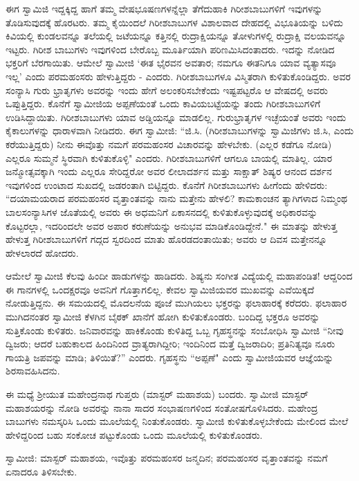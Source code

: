 ಈಗ ಸ್ವಾಮಿಜಿ ಇದ್ದಕ್ಕಿದ್ದ ಹಾಗೆ ತಮ್ಮ ವೇಷಭೂಷಣಗಳನ್ನೆಲ್ಲಾ ತೆಗೆದುಹಾಕಿ ಗಿರೀಶಬಾಬುಗಳಿಗೆ ಇವುಗಳನ್ನು ತೊಡಿಸುವುದಕ್ಕೆ ಹೊರಟರು. ತಮ್ಮ ಕೈಯಿಂದಲೆ ಗಿರೀಶಬಾಬುಗಳ ವಿಶಾಲವಾದ ದೇಹದಲ್ಲಿ ವಿಭೂತಿಯನ್ನು ಬಳಿದು ಕಿವಿಯಲ್ಲಿ ಕುಂಡಲವನ್ನೂ ತಲೆಯಲ್ಲಿ ಜಟೆಯನ್ನೂ ಕತ್ತಿನಲ್ಲಿ ರುದ್ರಾಕ್ಷಿಯನ್ನೂ ತೋಳುಗಳಲ್ಲಿ ರುದ್ರಾಕ್ಷಿ ವಲಯವನ್ನೂ ಇಟ್ಟರು. ಗಿರೀಶ ಬಾಬುಗಳು ಇವುಗಳಿಂದ ಬೇರೊಬ್ಬ ಮೂರ್ತಿಯಾಗಿ ಪರಿಣಮಿಸಿದಂತಾದರು. ಇದನ್ನು ನೋಡಿದ ಭಕ್ತರಿಗೆ ಬೆರಗಾಯಿತು. ಆಮೇಲೆ ಸ್ವಾಮೀಜಿ ‘ಈತ ಭೈರವನ ಅವತಾರ; ನಮಗೂ ಈತನಿಗೂ ಯಾವ ವ್ಯತ್ಯಾಸವೂ ಇಲ್ಲ’ ಎಂದು ಪರಮಹಂಸರು ಹೇಳುತ್ತಿದ್ದರು - ಎಂದರು. ಗಿರೀಶಬಾಬುಗಳೂ ವಿಸ್ಮಿತರಾಗಿ ಕುಳಿತುಕೊಂಡಿದ್ದರು. ಅವರ ಸಂನ್ಯಾಸಿ ಗುರು ಭ್ರಾತೃಗಳು ಅವರನ್ನು ಇಂದು ಹೇಗೆ ಅಲಂಕರಿಸಬೇಕೆಂದು ಇಷ್ಟಪಟ್ಟರೊ ಆ ವೇಷದಲ್ಲಿ ಅವರು ಒಪ್ಪುತ್ತಿದ್ದರು. ಕೊನೆಗೆ ಸ್ವಾಮೀಜಿಯ ಅಪ್ಪಣೆಯಂತೆ ಒಂದು ಕಾವಿಯಬಟ್ಟೆಯನ್ನು ತಂದು ಗಿರೀಶಬಾಬುಗಳಿಗೆ ಉಡಿಸಿದ್ದಾಯಿತು. ಗಿರೀಶಬಾಬುಗಳು ಯಾವ ಅಡ್ಡಿಯನ್ನೂ ಮಾಡಲಿಲ್ಲ. ಗುರುಭ್ರಾತೃಗಳ ಇಚ್ಛೆಯಂತೆ ಅವರು ಇಂದು ಕೈಕಾಲುಗಳನ್ನು ಧಾರಾಳವಾಗಿ ನೀಡಿದರು. ಈಗ ಸ್ವಾಮೀಜಿ: “ಜಿ.ಸಿ. (ಗಿರೀಶಬಾಬುಗಳನ್ನು ಸ್ವಾಮಿಜಿಗಳು ಜಿ.ಸಿ, ಎಂದು ಕರೆಯುತ್ತಿದ್ದರು) ನೀನು ಈವೊತ್ತು ನಮಗೆ ಪರಮಹಂಸರ ವಿಚಾರವನ್ನು ಹೇಳಬೇಕು. (ಎಲ್ಲರ ಕಡೆಗೂ ನೋಡಿ) ಎಲ್ಲರೂ ಸುಮ್ಮನೆ ಸ್ಥಿರವಾಗಿ ಕುಳಿತುಕೊಳ್ಳಿ" ಎಂದರು. ಗಿರೀಶಬಾಬುಗಳಿಗೆ ಆಗಲೂ ಬಾಯಲ್ಲಿ ಮಾತಿಲ್ಲ. ಯಾರ ಜನ್ಮೋತ್ಸವಕ್ಕಾಗಿ ಇಂದು ಎಲ್ಲರೂ ಸೇರಿದ್ದರೋ ಅವರ ಲೀಲಾದರ್ಶನ ಮತ್ತು ಸಾಕ್ಷಾತ್ ಶಿಷ್ಯರ ಆನಂದ ದರ್ಶನ ಇವುಗಳಿಂದ ಉಂಟಾದ ಸುಖದಲ್ಲಿ ಜಡರಂತಾಗಿ ಬಿಟ್ಟಿದ್ದರು. ಕೊನೆಗೆ ಗಿರೀಶಬಾಬುಗಳು ಹೀಗೆಂದು ಹೇಳಿದರು: “ದಯಾಮಯರಾದ ಪರಮಹಂಸರ ವೃತ್ತಾಂತವನ್ನು ನಾನು ಮತ್ತೇನು ಹೇಳಲಿ? ಕಾಮಕಾಂಚನ ತ್ಯಾಗಿಗಳಾದ ನಿಮ್ಮಂಥ ಬಾಲಸಂನ್ಯಾಸಿಗಳ ಜೊತೆಯಲ್ಲಿ ಅವರು ಈ ಅಧಮನಿಗೆ ಏಕಾಸನದಲ್ಲಿ ಕುಳಿತುಕೊಳ್ಳುವುದಕ್ಕೆ ಅಧಿಕಾರವನ್ನು ಕೊಟ್ಟರಲ್ಲಾ, ಇದರಿಂದಲೇ ಅವರ ಅಪಾರ ಕರುಣೆಯನ್ನು ಅನುಭವ ಮಾಡಿಕೊಂಡಿದ್ದೇನೆ." ಈ ಮಾತನ್ನು ಹೇಳುತ್ತ ಹೇಳುತ್ತ ಗಿರೀಶಬಾಬುಗಳಿಗೆ ಗದ್ಗದ ಸ್ವರದಿಂದ ಮಾತು ಹೊರಡದಂತಾಯಿತು; ಅವರು ಆ ದಿವಸ ಮತ್ತೇನನ್ನೂ ಹೇಳಲಾರದೆ ಹೋದರು.

ಆಮೇಲೆ ಸ್ವಾಮೀಜಿ ಕೆಲವು ಹಿಂದೀ ಹಾಡುಗಳನ್ನು ಹಾಡಿದರು. ಶಿಷ್ಯನು ಸಂಗೀತ ವಿದ್ಯೆಯಲ್ಲಿ ಮಹಾಪಂಡಿತ! ಆದ್ದರಿಂದ ಈ ಗಾನಗಳಲ್ಲಿ ಒಂದಕ್ಷರವೂ ಅವನಿಗೆ ಗೊತ್ತಾಗಲಿಲ್ಲ. ಕೇವಲ ಸ್ವಾಮಿಜಿಯವರ ಮುಖವನ್ನು ಎವೆಯಿಕ್ಕದೆ ನೋಡುತ್ತಿದ್ದನು. ಈ ಸಮಯದಲ್ಲಿ ಮೊದಲನೆಯ ಪೂಜೆ ಮುಗಿಯಲು ಭಕ್ತರನ್ನು ಫಲಾಹಾರಕ್ಕೆ ಕರೆದರು. ಫಲಾಹಾರ ಮುಗಿದನಂತರ ಸ್ವಾಮೀಜಿ ಕೆಳಗಿನ ಬೈಠಕ್ ಖಾನೆಗೆ ಹೋಗಿ ಕುಳಿತುಕೊಂಡರು. ಬಂದಿದ್ದ ಭಕ್ತರೂ ಅವರನ್ನು ಸುತ್ತಿಕೊಂಡು ಕುಳಿತರು. ಜನಿವಾರವನ್ನು ಹಾಕಿಕೊಂಡು ಕುಳಿತಿದ್ದ ಒಬ್ಬ ಗೃಹಸ್ಥನನ್ನು ಸಂಬೋಧಿಸಿ ಸ್ವಾಮೀಜಿ “ನೀವು ದ್ವಿಜರು; ಆದರೆ ಬಹುಕಾಲದ ಹಿಂದಿನಿಂದ ವ್ರಾತ್ಯರಾಗಿದ್ದೀರಿ; ಇಂದಿನಿಂದ ಮತ್ತೆ ದ್ವಿಜರಾದಿರಿ; ಪ್ರತಿನಿತ್ಯವೂ ನೂರು ಗಾಯತ್ರಿ ಜಪವನ್ನು ಮಾಡಿ; ತಿಳಿಯಿತೆ?” ಎಂದರು. ಗೃಹಸ್ಥನು “ಅಪ್ಪಣೆ" ಎಂದು ಸ್ವಾಮೀಜಿಯವರ ಆಜ್ಞೆಯನ್ನು ಶಿರಸಾವಹಿಸಿದನು.

ಈ ಮಧ್ಯೆ ಶ‍್ರೀಯುತ ಮಹೇಂದ್ರನಾಥ ಗುಪ್ತರು (ಮಾಸ್ಟರ್ ಮಹಾಶಯ) ಬಂದರು. ಸ್ವಾಮೀಜಿ ಮಾಸ್ಟರ್ ಮಹಾಶಯರನ್ನು ನೋಡಿ ಅವರನ್ನು ನಾನಾ ಸಾದರ ಸಂಭಾಷಣಗಳಿಂದ ಸಂತೋಷಗೊಳಿಸಿದರು. ಮಹೇಂದ್ರ ಬಾಬುಗಳು ನಮಸ್ಕರಿಸಿ ಒಂದು ಮೂಲೆಯಲ್ಲಿ ನಿಂತುಕೊಂಡರು. ಸ್ವಾಮೀಜಿ ಕುಳಿತುಕೊಳ್ಳಬೇಕೆಂದು ಮೇಲಿಂದ ಮೇಲೆ ಹೇಳಿದ್ದರಿಂದ ಬಹು ಸಂಕೋಚ ಪಟ್ಟುಕೊಂಡು ಒಂದು ಮೂಲೆಯಲ್ಲಿ ಕುಳಿತುಕೊಂಡರು.

ಸ್ವಾಮೀಜಿ: ಮಾಸ್ಟರ್ ಮಹಾಶಯ, ಇವೊತ್ತು ಪರಮಹಂಸರ ಜನ್ಮದಿನ; ಪರಮಹಂಸರ ವೃತ್ತಾಂತವನ್ನು ನಮಗೆ ಏನಾದರೂ ತಿಳಿಸಬೇಕು.

